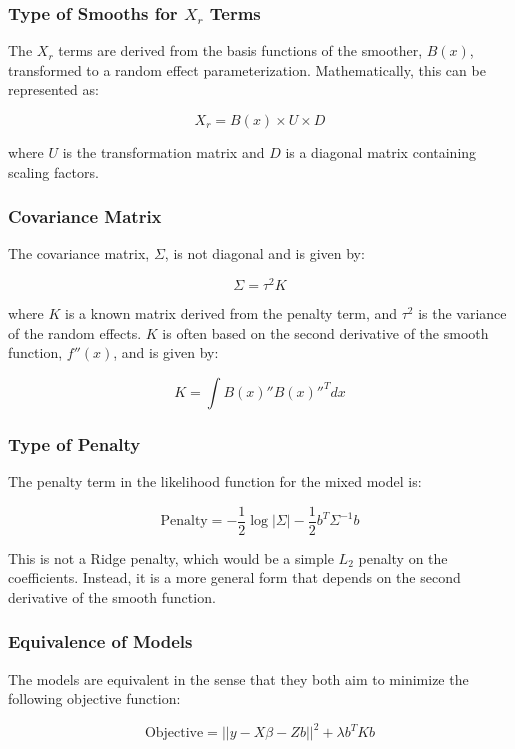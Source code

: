 \subsubsection{Type of Smooths for \(X_r\) Terms}

The \(X_r\) terms are derived from the basis functions of the smoother, \(B(x)\), transformed to a random effect parameterization. Mathematically, this can be represented as:

\[
X_r = B(x) \times U \times D
\]

where \(U\) is the transformation matrix and \(D\) is a diagonal matrix containing scaling factors.

\subsubsection{Covariance Matrix}

The covariance matrix, \(\Sigma\), is not diagonal and is given by:

\[
\Sigma = \tau^2 K
\]

where \(K\) is a known matrix derived from the penalty term, and \(\tau^2\) is the variance of the random effects. \(K\) is often based on the second derivative of the smooth function, \(f''(x)\), and is given by:

\[
K = \int B(x)'' B(x)''^T dx
\]

\subsubsection{Type of Penalty}

The penalty term in the likelihood function for the mixed model is:

\[
\text{Penalty} = -\frac{1}{2} \log | \Sigma | - \frac{1}{2} b^T \Sigma^{-1} b
\]

This is not a Ridge penalty, which would be a simple \(L_2\) penalty on the coefficients. Instead, it is a more general form that depends on the second derivative of the smooth function.

\subsubsection{Equivalence of Models}

The models are equivalent in the sense that they both aim to minimize the following objective function:

\[
\text{Objective} = ||y - X\beta - Zb||^2 + \lambda b^T K b
\]

